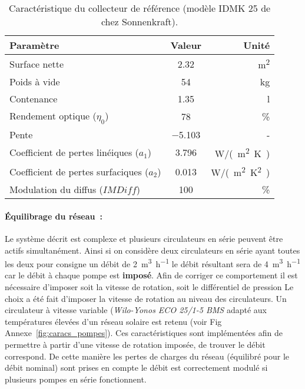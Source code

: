 \begin{table}
\centering
\caption{Caractéristique du collecteur de référence (modèle IDMK 25 de chez Sonnenkraft).}
\label{tab:idmk_specs}
\begin{tabular}{lcr}
    \toprule
    Paramètre                                   & Valeur         & Unité                 \\
    \midrule
    Surface nette                               & \num{2.32}           & \si{m^{2}}            \\
    Poids à vide                                & \num{54}             & \si{kg}               \\
    Contenance                                  & \num{1.35}           & \si{l}                \\
    Rendement optique ($\eta_{0}$)              & \num{78}             & \si{\%}               \\
    Pente                                       & \num{-5.103}         & -                     \\
    Coefficient de pertes linéiques ($a_{1}$)   & \num{3.796}          & \si{W/(m^{2}.K)}      \\
    Coefficient de pertes surfaciques ($a_{2}$) & \num{0.013}          & \si{W/(m^{2}.K^{2})}  \\
    Modulation du diffus ($IMDiff$)             & \num{100}            & \si{\%}               \\
    \bottomrule
\end{tabular}
\end{table}

\paragraph{Équilibrage du réseau~:} %
\label{par:equilibrage_du_reseau}
Le système décrit est complexe et plusieurs circulateurs en série peuvent être actifs
simultanément. Ainsi si on considère deux circulateurs en série ayant toutes les deux pour
consigne un débit de \SI[per- mode=symbol]{2}{\meter\cubed\per\hour} le débit résultant
sera de \SI[per-mode=symbol]{4}{\meter\cubed\per\hour} car le débit à chaque pompe est
\textbf{imposé}. Afin de corriger ce comportement il est nécessaire d’imposer soit la
vitesse de rotation, soit le différentiel de pression Le choix a été fait d’imposer la
vitesse de rotation au niveau des circulateurs. Un circulateur à vitesse variable (\textit
{Wilo-Yonos ECO 25/1-5 BMS} adapté aux températures élevées d’un réseau solaire est
retenu (voir Fig Annexe~\ref{fig:caracs_pompes}).
Ces caractéristiques sont implémentées afin de permettre à partir d’une vitesse de
rotation imposée, de trouver le débit correspond. De cette manière les pertes de charges
du réseau (équilibré pour le débit nominal) sont prises en compte le débit est
correctement modulé si plusieurs pompes en série fonctionnent.


